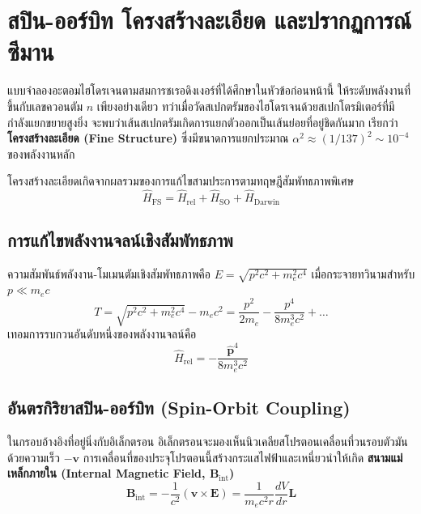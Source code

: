 \section{สปิน-ออร์บิท โครงสร้างละเอียด และปรากฏการณ์ซีมาน}

แบบจำลองอะตอมไฮโดรเจนตามสมการชเรอดิงเงอร์ที่ได้ศึกษาในหัวข้อก่อนหน้านี้ ให้ระดับพลังงานที่ขึ้นกับเลขควอนตัม $n$ เพียงอย่างเดียว ทว่าเมื่อวัดสเปกตรัมของไฮโดรเจนด้วยสเปกโตรมิเตอร์ที่มีกำลังแยกขยายสูงยิ่ง จะพบว่าเส้นสเปกตรัมเกิดการแยกตัวออกเป็นเส้นย่อยที่อยู่ชิดกันมาก เรียกว่า \textbf{โครงสร้างละเอียด (Fine Structure)} ซึ่งมีขนาดการแยกประมาณ $\alpha^2 \approx (1/137)^2 \sim 10^{-4}$ ของพลังงานหลัก

โครงสร้างละเอียดเกิดจากผลรวมของการแก้ไขสามประการตามทฤษฎีสัมพัทธภาพพิเศษ
\begin{equation}
\hat{H}_{\text{FS}} = \hat{H}_{\text{rel}} + \hat{H}_{\text{SO}} + \hat{H}_{\text{Darwin}}
\end{equation}

\subsection{การแก้ไขพลังงานจลน์เชิงสัมพัทธภาพ}
ความสัมพันธ์พลังงาน-โมเมนตัมเชิงสัมพัทธภาพคือ $E = \sqrt{p^2 c^2 + m_e^2 c^4}$ เมื่อกระจายทวินามสำหรับ $p \ll m_e c$
\begin{equation}
T = \sqrt{p^2 c^2 + m_e^2 c^4} - m_e c^2 = \frac{p^2}{2m_e} - \frac{p^4}{8m_e^3 c^2} + \dots
\end{equation}
เทอมการรบกวนอันดับหนึ่งของพลังงานจลน์คือ
\begin{equation}
\hat{H}_{\text{rel}} = -\frac{\hat{\mathbf{p}}^4}{8m_e^3 c^2}
\end{equation}

\subsection{อันตรกิริยาสปิน-ออร์บิท (Spin-Orbit Coupling)}
ในกรอบอ้างอิงที่อยู่นิ่งกับอิเล็กตรอน อิเล็กตรอนจะมองเห็นนิวเคลียสโปรตอนเคลื่อนที่วนรอบตัวมันด้วยความเร็ว $-\mathbf{v}$ การเคลื่อนที่ของประจุโปรตอนนี้สร้างกระแสไฟฟ้าและเหนี่ยวนำให้เกิด \textbf{สนามแม่เหล็กภายใน (Internal Magnetic Field, $\mathbf{B}_{\text{int}}$)}
\begin{equation}
\mathbf{B}_{\text{int}} = -\frac{1}{c^2} (\mathbf{v} \times \mathbf{E}) = \frac{1}{m_e c^2 r} \frac{dV}{dr} \mathbf{L}
\end{equation}

